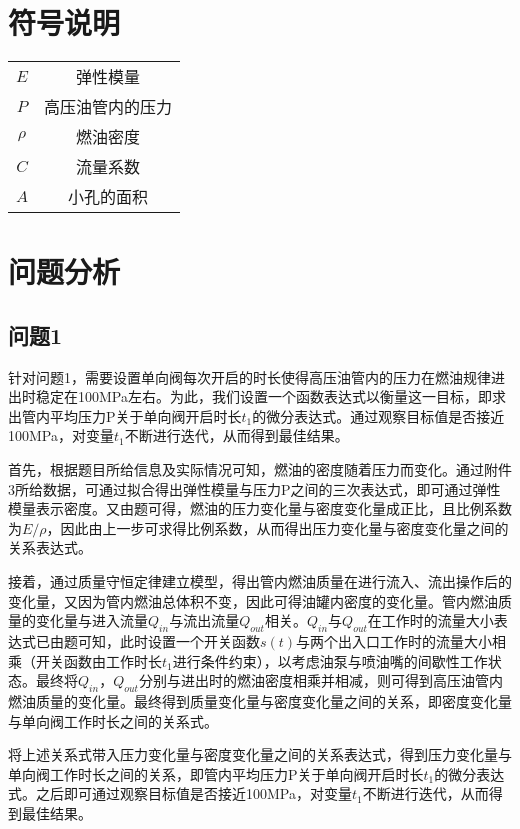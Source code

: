 \documentclass{cumcmthesis}
\begin{document}
\section{符号说明}

\begin{center}
	\begin{tabular}{cc}
		\toprule[1.5pt]
		\makebox[0.3\textwidth][c]{符号}	& \makebox[0.4\textwidth][c]{意义} \\
		\hline
	 $E$ & 弹性模量 \\
	$P$ & 高压油管内的压力 \\  
	$\rho$ & 燃油密度 \\ 
	$C$ & 流量系数 \\
	$A$ & 小孔的面积 \\
	\bottomrule[1.5pt]
	\end{tabular}
\end{center}

\section{问题分析}
\subsection{问题1}
针对问题1，需要设置单向阀每次开启的时长使得高压油管内的压力在燃油规律进出时稳定在100MPa左右。为此，我们设置一个函数表达式以衡量这一目标，即求出管内平均压力P关于单向阀开启时长$t_{1}$的微分表达式。通过观察目标值是否接近100MPa，对变量$t_{1}$不断进行迭代，从而得到最佳结果。

首先，根据题目所给信息及实际情况可知，燃油的密度随着压力而变化。通过附件3所给数据，可通过拟合得出弹性模量与压力P之间的三次表达式，即可通过弹性模量表示密度。又由题可得，燃油的压力变化量与密度变化量成正比，且比例系数为$E/\rho$，因此由上一步可求得比例系数，从而得出压力变化量与密度变化量之间的关系表达式。

接着，通过质量守恒定律建立模型，得出管内燃油质量在进行流入、流出操作后的变化量，又因为管内燃油总体积不变，因此可得油罐内密度的变化量。管内燃油质量的变化量与进入流量$Q_{in}$与流出流量$Q_{out}$相关。$Q_{in}$与$Q_{out}$在工作时的流量大小表达式已由题可知，此时设置一个开关函数$s(t)$与两个出入口工作时的流量大小相乘（开关函数由工作时长$t_{1}$进行条件约束），以考虑油泵与喷油嘴的间歇性工作状态。最终将$Q_{in}$，$Q_{out}$分别与进出时的燃油密度相乘并相减，则可得到高压油管内燃油质量的变化量。最终得到质量变化量与密度变化量之间的关系，即密度变化量与单向阀工作时长之间的关系式。

将上述关系式带入压力变化量与密度变化量之间的关系表达式，得到压力变化量与单向阀工作时长之间的关系，即管内平均压力P关于单向阀开启时长$t_{1}$的微分表达式。之后即可通过观察目标值是否接近100MPa，对变量$t_{1}$不断进行迭代，从而得到最佳结果。
\end{document}
